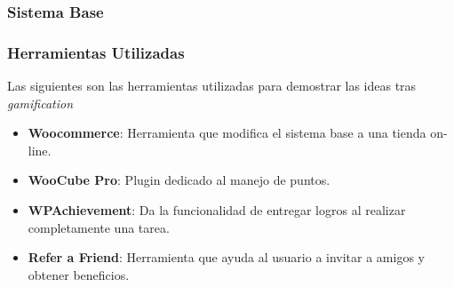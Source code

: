 \documentclass[10pt, compress]{beamer}
\begin{document}
\begin{frame}
 \frametitle{Sistema Base}

\begin{table}[h]
\footnotesize
\setlength\extrarowheight{5pt}
\caption{Tabla de comparación entre los sistemas bases investigados}
\label{tab:comp_tools}
\end{table}


\end{frame}

\begin{frame}
 \frametitle{Herramientas Utilizadas}

Las siguientes son las herramientas utilizadas para demostrar las ideas tras \emph{gamification}

\begin{itemize}
 \item \textbf{Woocommerce}: Herramienta que modifica el sistema base a una tienda on-line.
 \item \textbf{WooCube Pro}: Plugin dedicado al manejo de puntos.
 \item \textbf{WPAchievement}: Da la funcionalidad de entregar logros al realizar completamente una tarea.
 \item \textbf{Refer a Friend}: Herramienta que ayuda al usuario a invitar a amigos y obtener beneficios.
\end{itemize}
\end{frame}
\end{document}
